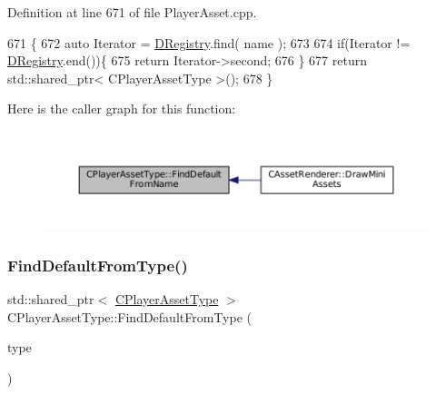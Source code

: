 Definition at line 671 of file Player\+Asset.\+cpp.


\begin{DoxyCode}
671                                                                                             \{
672     \textcolor{keyword}{auto} Iterator = \hyperlink{classCPlayerAssetType_a24f4ccd06fbddacc936e31a2f1f12ed5}{DRegistry}.find( name );
673     
674     \textcolor{keywordflow}{if}(Iterator != \hyperlink{classCPlayerAssetType_a24f4ccd06fbddacc936e31a2f1f12ed5}{DRegistry}.end())\{
675         \textcolor{keywordflow}{return} Iterator->second;    
676     \}
677     \textcolor{keywordflow}{return} std::shared\_ptr< CPlayerAssetType >();
678 \}
\end{DoxyCode}
Here is the caller graph for this function\+:
\nopagebreak
\begin{figure}[H]
\begin{center}
\leavevmode
\includegraphics[width=350pt]{classCPlayerAssetType_a7e1684eac4efaf7afe9a5c15af262b33_icgraph}
\end{center}
\end{figure}
\hypertarget{classCPlayerAssetType_a7b3c6682f379bfcd974342329eaabab9}{}\label{classCPlayerAssetType_a7b3c6682f379bfcd974342329eaabab9} 
\subsubsection{\texorpdfstring{Find\+Default\+From\+Type()}{FindDefaultFromType()}}
{\footnotesize\ttfamily std\+::shared\+\_\+ptr$<$ \hyperlink{classCPlayerAssetType}{C\+Player\+Asset\+Type} $>$ C\+Player\+Asset\+Type\+::\+Find\+Default\+From\+Type (\begin{DoxyParamCaption}\item[{\hyperlink{GameDataTypes_8h_a5600d4fc433b83300308921974477fec}{E\+Asset\+Type}}]{type }\end{DoxyParamCaption})\hspace{0.3cm}{\ttfamily [static]}}



